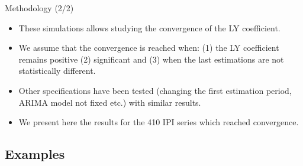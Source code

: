 \documentclass[10pt]{beamer}
\begin{document}
\begin{frame}{Methodology (2/2)}
\begin{itemize}
	\item These simulations allows studying the convergence of the LY coefficient.
	\item We assume that the convergence is reached when: (1) the LY coefficient remains positive (2) significant and (3) when the last estimations are not statistically different.
	\item Other specifications have been tested (changing the first estimation period, ARIMA model not fixed etc.) with similar results.
	\item We present here the results for the 410 IPI series which reached convergence.
\end{itemize}
\end{frame}

\subsection{Examples}

\end{document}
